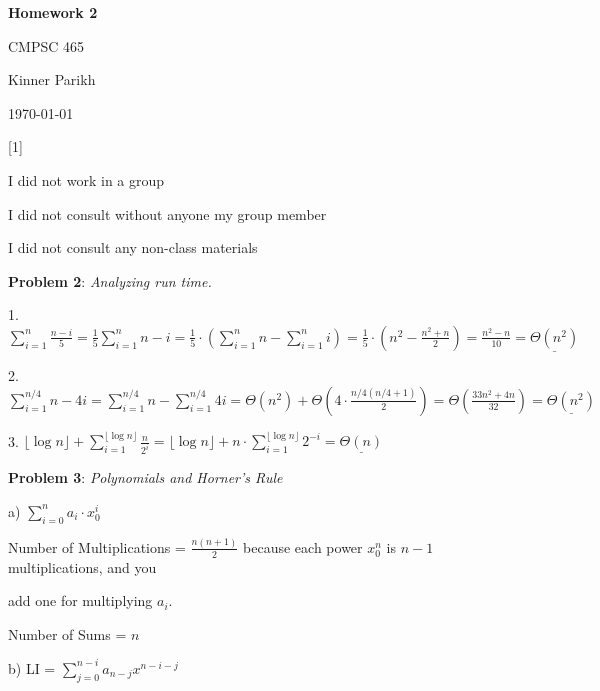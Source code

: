 \documentclass{article} %
\newcommand{\question}[2][]{\begin{flushleft}
        \textbf{Problem #1}: \textit{#2}

\end{flushleft}}
\newcommand{\maketitletwo}[2][]{\begin{center}
        \Large{\textbf{Homework #1}
            
            CMPSC 465} %
        \vspace{5pt}
        
        \normalsize{Kinner Parikh  %
        
        \today}        %
        \vspace{40pt}


        \newpage
        
\end{center}}
\begin{document}
    \maketitletwo[2]  %

    \question[1]{}
    \begin{center}
        
        I did not work in a group
    
        I did not consult without anyone my group member
    
        I did not consult any non-class materials
    \end{center}
    
    \newpage

    \question[2]{Analyzing run time.}

    1. $\sum^{n}_{i = 1} \frac{n-i}{5} = \frac{1}{5}\sum^{n}_{i = 1} n - i = \frac{1}{5} \cdot (\sum^{n}_{i = 1} n  - \sum^{n}_{i = 1} i) = \frac{1}{5} \cdot (n^2 - \frac{n^2 + n}{2}) = \frac{n^2 - n}{10} = \underline{\Theta(n^2)}$

    \vspace*{10 pt}

    2. $\sum^{n/4}_{i = 1} n - 4i = \sum^{n/4}_{i = 1} n - \sum^{n/4}_{i = 1} 4i = \Theta(n^2) + \Theta(4 \cdot \frac{n/4 (n/4 + 1)}{2}) = \Theta(\frac{33n^2 + 4n}{32}) = \underline{\Theta(n^2)}$

    \vspace*{10pt}

    3. $\lfloor \log n \rfloor + \sum^{\lfloor \log n \rfloor}_{i = 1} \frac{n}{2^i} = \lfloor \log n \rfloor + n \cdot \sum^{\lfloor \log n \rfloor}_{i = 1} 2^{-i} = \underline{\Theta(n)}$

    \newpage

    \question[3]{Polynomials and Horner's Rule}

    a) $\sum^{n}_{i = 0} a_i \cdot x_0^i$
    
    \hspace{12pt}Number of Multiplications = $\frac{n(n + 1)}{2}$ because each power $x^n_0$ is $n - 1$ multiplications, and you 
    
    \hspace{12pt}add one for multiplying $a_i$.
    
    \hspace{12pt}Number of Sums = $n$

    \vspace{5pt}
    

    b) LI = $\sum^{n - i}_{j = 0} a_{n - j}x^{n - i - j}$
\end{document}
